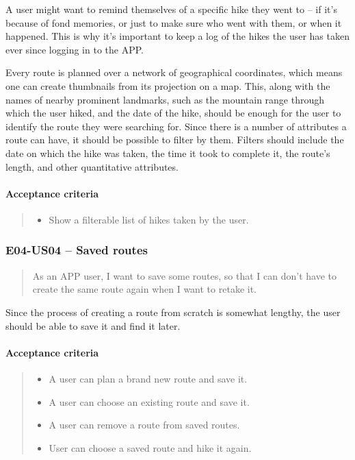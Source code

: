A user might want to remind themselves of a specific hike they went to -- if it's because of fond memories, or just to make sure who went with them, or when it happened.
This is why it's important to keep a log of the hikes the user has taken ever since logging in to the APP.

Every route is planned over a network of geographical coordinates, which means one can create thumbnails from its projection on a map.
This, along with the names of nearby prominent landmarks, such as the mountain range through which the user hiked, and the date of the hike, should be enough for the user to identify the route they were searching for.
Since there is a number of attributes a route can have, it should be possible to filter by them.
Filters should include the date on which the hike was taken, the time it took to complete it, the route's length, and other quantitative attributes.

\paragraph*{Acceptance criteria}
\begin{quote}
\begin{itemize}
    \item Show a filterable list of hikes taken by the user.
\end{itemize}
\end{quote}

\subsubsection*{E04-US04 -- Saved routes}
\begin{quote}
As an APP user, I want to save some routes, so that I can don't have to create the same route again when I want to retake it.
\end{quote}

Since the process of creating a route from scratch is somewhat lengthy, the user should be able to save it and find it later.

\paragraph*{Acceptance criteria}
\begin{quote}
\begin{itemize}
    \item A user can plan a brand new route and save it.
    \item A user can choose an existing route and save it.
    \item A user can remove a route from saved routes.
    \item User can choose a saved route and hike it again.
\end{itemize}
\end{quote}

